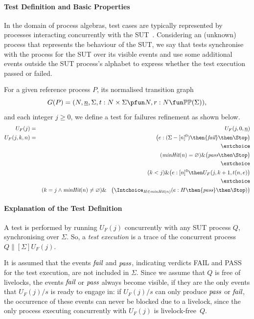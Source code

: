 \documentclass[3p,times]{elsarticle}
\newcommand{\taba}{\hspace*{3mm}}
\newcommand{\epass}{{\text{\it pass}}}
\newcommand{\efail}{{\text{\it fail}}}
\newcommand{\ii}[1]{\underline{#1}}
\newcommand{\minhits}{\text{\it minHit}}
\begin{document}
\paragraph{Test Definition and Basic Properties}
In the domain of process algebras, test cases are typically represented by
processes interacting concurrently with the
SUT~\cite{Hennessy:1988:ATP:50497}. Considering an (unknown) process that
represents the behaviour of the SUT, we say that tests synchronise with the
process for the SUT over its visible events and use some additional events
outside the SUT process's alphabet to express whether the test execution
passed or failed.

For a given reference process $P$, its normalised transition graph
$$
G(P) = ( N, \ii n, \Sigma, t : N\times\Sigma \pfun N, r : N \fun \mathbb{P}\mathbb{P}(\Sigma)),
$$
and each integer $j\ge 0$, we define a test for failures refinement as shown
below.
%
\begin{eqnarray}
\label{eq:UFP}
U_F(j) & = & U_F(j,0,\ii n)
\\
U_F(j,k,n) & = & \big(e:(\Sigma - [n]^0)  \then \efail\then \Stop \big)
\label{eq:ufa}
\\ & & \extchoice \nonumber
\\ & & (\minhits(n) =   \varnothing  )    \&   \big( \epass \then \Stop \big)
\label{eq:ufb}
\\ & & \extchoice \nonumber
\\ & & (k < j) \& \big(e:[n]^0   \then U_F(j,k+1,t(n,e) \big)
\label{eq:ufc}
\\ & & \extchoice \nonumber
\\ & & (k = j \wedge \minhits(n)\neq\varnothing) \& \taba \big( \Intchoice_{H\in\minhits(n)} (e:H   \then \epass \then\Stop   )  \big)
\label{eq:ufd}
\end{eqnarray}

\paragraph{Explanation of the Test Definition} A test  is performed by running
$U_F(j)$ concurrently with any SUT process $Q$, synchronising over $\Sigma$.
So, a \emph{test execution} is a trace of the concurrent process
$Q\parallel[\Sigma] U_F(j)$.

It is assumed that the events $\efail$ and $\epass$, indicating verdicts FAIL
and PASS for the test execution, are not included in $\Sigma$. Since we
assume that $Q$ is free of livelocks, the events $\efail$ or $\epass$ always
become visible, if they are the only events that $U_F(j)/s$ is ready to engage in:
if $U_F(j)/s$ can only produce $\epass$ or $\efail$, the occurrence of these
events can never be blocked due to a livelock, since the only
  process executing concurrently with  $U_F(j)$  is livelock-free~$Q$.
\end{document}
